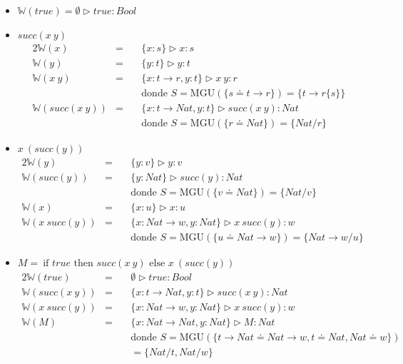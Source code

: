 \documentclass{report}
\theoremstyle{definition} %
\newcommand{\tfunc}[2]{#1 \to #2}
\newcommand{\ifte}[3]{\ \text{if } #1 \text{ then } #2 \text{ else } #3}
\newcommand{\app}[2]{#1 \ #2} %
\newcommand{\sust}[2]{#1 \{ #2 \}}
\newcommand{\tipa}[3]{#1 \rhd #2 : #3} %
\newcommand{\suc}[1]{succ(#1)}
\newcommand{\sustfor}[2]{#1/#2} %
\newcommand{\infer}[1]{\mathbb{W}(#1)}
\newcommand{\etipa}[2]{\tipa{\emptyset}{#1}{#2}} %
\newcommand{\unify}[2]{#1 \doteq #2}
\newcommand{\mgu}[2]{\text{MGU}(\{ \unify{#1}{#2} \})}
\begin{document}
\begin{itemize}
    \item $\infer{true} = \etipa{true}{Bool}$
    \item $\suc{\app{x}{y}}$
    \begin{alignat*}{2}
        \infer{x} &=\ &&\tipa{\{x:s\}}{x}{s}\\
        \infer{y} &=\ &&\tipa{\{y:t\}}{y}{t}\\
        \infer{\app{x}{y}} &=\
        &&\tipa
            {\{ x: \tfunc{t}{r}, y: t\}}
            {\app{x}{y}}
            {r}\\
        & &&\text{donde } S = \mgu{s}{\tfunc{t}{r}} = \{ \sust{\tfunc{t}{r}}{s}
        \}\\
        \infer{\suc{\app{x}{y}}} &=\
        &&\tipa
            {\{ x: \tfunc{t}{Nat}, y: t \}}
            { \suc{\app{x}{y}} }
            {Nat}\\
        & &&\text{donde } S = \mgu{r}{Nat} = \{ \sustfor{Nat}{r} \}
    \end{alignat*}

    \item $\app{x}{(\suc{y})}$
    \begin{alignat*}{2}
        \infer{y} &=\ &&\tipa{\{y:v\}}{y}{v}\\
        \infer{\suc{y}} &=\
            &&\tipa{\{y: Nat\}}{\suc{y}}{Nat}\\
            & &&\text{donde } S = \mgu{v}{Nat} = \{ \sustfor{Nat}{v} \} \\
        \infer{x} &=\ &&\tipa{\{x:u\}}{x}{u}\\
        \infer{\app{x}{\suc{y}}} &=\
        &&\tipa
            {\{ x: \tfunc{Nat}{w}, y:Nat \}}
            {\app{x}{\suc{y}}}
            {w}\\
        & &&\text{donde } S = \mgu{u}{\tfunc{Nat}{w}} = \{
        \sustfor{\tfunc{Nat}{w}}{u} \}
    \end{alignat*}
    \item $M = \ifte{true}{\suc{\app{x}{y}}}{\app{x}{(\suc{y})}}$
    \begin{alignat*}{2}
        \infer{true} &=\
            &&\etipa{true}{Bool}\\
        \infer{\suc{\app{x}{y}}} &=\
            &&\tipa
            {\{ x: \tfunc{t}{Nat}, y: t \}}
            { \suc{\app{x}{y}} }
            {Nat}\\
        \infer{\app{x}{\suc{y}}} &=\
            &&\tipa
            {\{ x: \tfunc{Nat}{w}, y:Nat \}}
            {\app{x}{\suc{y}}}
            {w}\\
        \infer{M} &=\
            &&\tipa
                {\{ x: \tfunc{Nat}{Nat}, y: Nat\}}
                {M}
                {Nat}\\
        & && \text{donde }
        S = \text{MGU}(\{
            \unify{\tfunc{t}{Nat}}{\tfunc{Nat}{w}},
            \unify{t}{Nat},
            \unify{Nat}{w}
        \})\\
        & &&= \{ \sustfor{Nat}{t}, \sustfor{Nat}{w} \}
    \end{alignat*}


\end{itemize}
\end{document}
